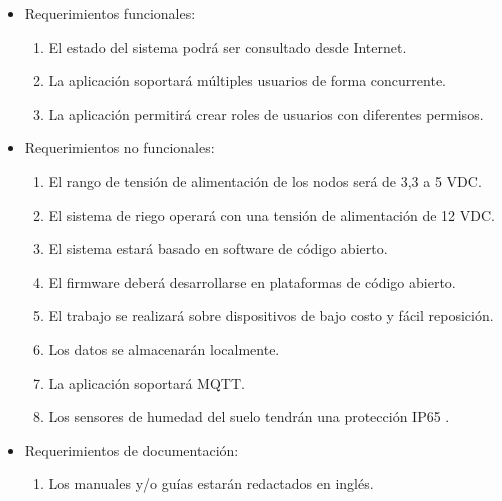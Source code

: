 \begin{itemize}
\item Requerimientos funcionales:
\begin{enumerate}

\item El estado del sistema podrá ser consultado desde Internet.
\item La aplicación soportará múltiples usuarios de forma concurrente.
\item La aplicación permitirá crear roles de usuarios con diferentes permisos.
\end{enumerate}
\end{itemize} 
\begin{itemize}
\item Requerimientos no funcionales:
\begin{enumerate}
\item El rango de tensión de alimentación de los nodos será de 3,3 a 5 VDC.
\item El sistema de riego operará con una tensión de alimentación de 12 VDC.
\item El sistema estará basado en software de código abierto.
\item El firmware deberá desarrollarse en plataformas de código abierto.
\item El trabajo se realizará sobre dispositivos de bajo costo y fácil reposición.
\item Los datos se almacenarán localmente.
\item La aplicación soportará MQTT.
\item Los sensores de humedad del suelo tendrán una protección IP65 \citep{ip65}. 
\end{enumerate}


\end{itemize} 
\begin{itemize}
\item Requerimientos de documentación:
\begin{enumerate}
\item Los manuales y/o guías estarán redactados en inglés.
\end{enumerate}


\end{itemize}
